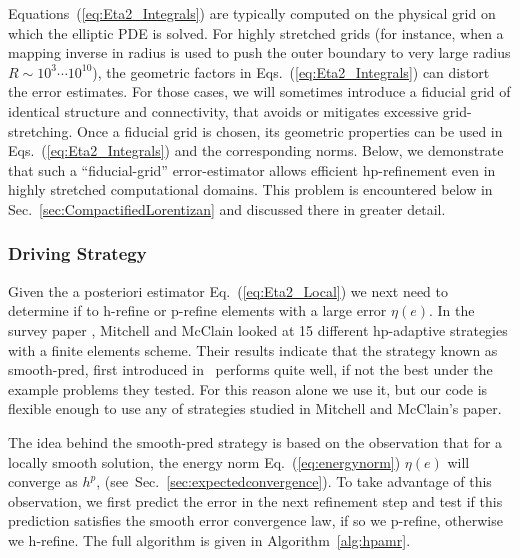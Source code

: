 %
  Equations~(\ref{eq:Eta2_Integrals}) are typically computed on the physical grid on which the elliptic PDE is solved.
  For highly stretched grids (for instance, when a mapping inverse in
  radius is used to push the outer boundary to very large radius
  $R\sim 10^3 \cdots 10^{10}$), the geometric factors in
  Eqs.~(\ref{eq:Eta2_Integrals}) can distort the error estimates.  For
  those cases, we will sometimes introduce a fiducial grid of
  identical structure and connectivity, that avoids or mitigates
  excessive grid-stretching.  Once a fiducial grid is chosen, its geometric properties can be used in Eqs.~(\ref{eq:Eta2_Integrals}) and the corresponding norms.  Below, we demonstrate that such a ``fiducial-grid'' error-estimator allows
  efficient hp-refinement even in highly stretched computational domains.  This problem is encountered below in
Sec.~\ref{sec:CompactifiedLorentizan} and discussed there in greater
detail.

%
\subsubsection{Driving Strategy}

Given the a posteriori estimator
Eq.~(\ref{eq:Eta2_Local}) we next need to determine if  to h-refine or p-refine elements with a large error $\eta(e)$. In the survey paper \cite{mitchell2011survey}, Mitchell and McClain looked at 15 different hp-adaptive strategies with a finite elements scheme. Their results indicate that the strategy known as smooth-pred, first introduced in~\cite{melenk2001residual} performs quite well, if not the best under
the example problems they tested. For this reason alone we use it, but
our code is flexible enough to use any of strategies studied in
Mitchell and McClain's paper.


The idea behind the smooth-pred strategy is based on the observation that for a locally smooth solution, the
energy norm Eq.~(\ref{eq:energynorm}) $\eta(e)$ will converge as
$h^{p}$, (see~Sec.~\ref{sec:expectedconvergence}).  To take advantage of this observation, we first predict the error in the next refinement step and test if this prediction satisfies the smooth error convergence law, if so we p-refine, otherwise we h-refine. The full algorithm is given in Algorithm~\ref{alg:hpamr}.


